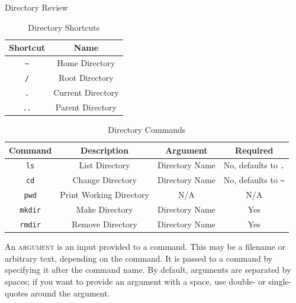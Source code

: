 \begin{frame}[c]{Directory Review}

   {
    \vspace{-0.75em}
  }

  \begin{table}
    \centering
    \begin{tabular}{c|c}
      Shortcut & Name\\
      \hline
      \texttt{\textasciitilde} & Home Directory \\
      \texttt{/} & Root Directory \\
      \texttt{.} & Current Directory \\
      \texttt{..} & Parent Directory \\
    \end{tabular}
    \caption{Directory Shortcuts}
    \label{tab:dir_shortcuts}
  \end{table}

  \pause

  \begin{table}
    \centering
    \begin{tabular}{c|c|c|c}
      Command & Description & Argument & Required \\
      \hline
      \texttt{ls} & List Directory & Directory Name & No, defaults to \texttt{.} \\
      \texttt{cd} & Change Directory & Directory Name & No, defaults to \texttt{\textasciitilde} \\
      \texttt{pwd} & Print Working Directory & N/A & N/A \\
      \texttt{mkdir} & Make Directory & Directory Name & Yes \\
      \texttt{rmdir} & Remove Directory & Directory Name & Yes \\
    \end{tabular}
    \caption{Directory Commands}
    \label{tab:dir_commands}
  \end{table}

   {
    \begin{definition}[argument]
      An \textsc{argument} is an input provided to a command.  This may be a
      filename or arbitrary text, depending on the command.  It is passed to a
      command by specifying it after the command name.  By default, arguments
      are separated by spaces; if you want to provide an argument with a space,
      use double- or single-quotes around the argument.
    \end{definition}
  }
\end{frame}

